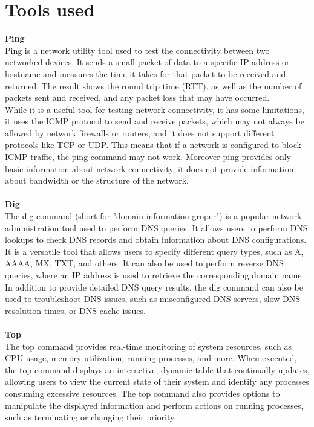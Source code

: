\section{Tools used}
\textbf{Ping} \\
Ping is a network utility tool used to test the connectivity between two networked devices.
It sends a small packet of data to a specific IP address or hostname and measures the time it takes for that packet to be received and returned.
The result shows the round trip time (RTT), as well as the number of packets sent and received, and any packet loss that may have occurred.\\
While it is a useful tool for testing network connectivity, it has some limitations,
it uses the ICMP protocol to send and receive packets, which may not always be allowed by network firewalls or routers, and it does not support different protocols like TCP or UDP.
This means that if a network is configured to block ICMP traffic, the ping command may not work.
Moreover ping provides only basic information about network connectivity, it does not provide information about bandwidth or the structure of the network.\\
\\
\textbf{Dig} \\
The dig command (short for "domain information groper") is a popular network administration tool used to perform DNS queries.
It allows users to perform DNS lookups to check DNS records and obtain information about DNS configurations.
It is a versatile tool that allows users to specify different query types, such as A, AAAA, MX, TXT, and others.
It can also be used to perform reverse DNS queries, where an IP address is used to retrieve the corresponding domain name.
In addition to provide detailed DNS query results, the dig command can also be used to troubleshoot DNS issues, such as misconfigured DNS servers,
slow DNS resolution times, or DNS cache issues.\\
\\
\textbf{Top} \\
The top command provides real-time monitoring of system resources, such as CPU usage, memory utilization, running processes, and more.
When executed, the top command displays an interactive, dynamic table that continually updates, allowing users to view
the current state of their system and identify any processes consuming excessive resources.
The top command also provides options to manipulate the displayed information and perform actions on running processes,
such as terminating or changing their priority.\\
